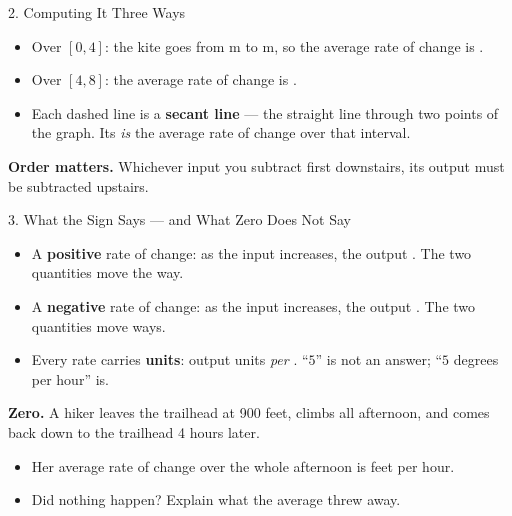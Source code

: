 \documentclass[10pt]{article}
\begin{document}
\begin{notesbox}{2. Computing It Three Ways}
\begin{itemize}[itemsep=4pt]
  \item Over $[0,4]$: the kite goes from \blank{1cm} m to \blank{1cm} m, so
        the average rate of change is \blank{3.2cm}.
  \item Over $[4,8]$: the average rate of change is \blank{3.2cm}.
  \item Each dashed line is a \textbf{secant line} --- the straight line
        through two points of the graph. Its \blank{1.6cm} \textit{is} the
        average rate of change over that interval.
\end{itemize}

\medskip
\textbf{Order matters.} Whichever input you subtract first downstairs, its
output must be subtracted \blank{2.2cm} upstairs.
\end{notesbox}

\vspace{0.1in}

\boxguard[20]
\begin{notesbox}{3. What the Sign Says --- and What Zero Does Not Say}
\begin{itemize}[itemsep=4pt]
  \item A \textbf{positive} rate of change: as the input increases, the output
        \blank{2.2cm}. The two quantities move the \blank{2cm} way.
  \item A \textbf{negative} rate of change: as the input increases, the output
        \blank{2.2cm}. The two quantities move \blank{2.4cm} ways.
  \item Every rate carries \textbf{units}: output units \textit{per}
        \blank{3cm}. ``$5$'' is not an answer; ``$5$ degrees per hour'' is.
\end{itemize}

\medskip
\textbf{Zero.} A hiker leaves the trailhead at 900 feet, climbs all afternoon,
and comes back down to the trailhead 4 hours later.

\begin{itemize}[itemsep=4pt]
  \item Her average rate of change over the whole afternoon is
        \blank{3cm} feet per hour.
  \item Did nothing happen? \blank{1.6cm} \; Explain what the average threw
        away.

        \vspace{0.05in}
        \writeline
\end{itemize}
\end{notesbox}
\end{document}
